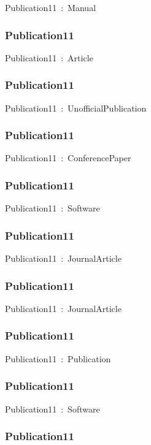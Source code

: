 \documentclass{article}
\begin{document}
Publication11~:~Manual

\subsubsection*{Publication11}

Publication11~:~Article

\subsubsection*{Publication11}

Publication11~:~UnofficialPublication

\subsubsection*{Publication11}

Publication11~:~ConferencePaper

\subsubsection*{Publication11}

Publication11~:~Software

\subsubsection*{Publication11}

Publication11~:~JournalArticle

\subsubsection*{Publication11}

Publication11~:~JournalArticle

\subsubsection*{Publication11}

Publication11~:~Publication

\subsubsection*{Publication11}

Publication11~:~Software

\subsubsection*{Publication11}
\end{document}
